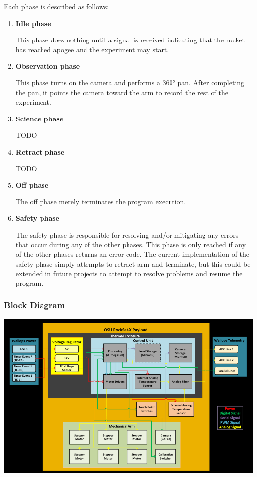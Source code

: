 Each phase is described as follows:
\begin{enumerate}
	\item{\textbf{Idle phase}}

	This phase does nothing until a signal is received indicating that the
	rocket has reached apogee and the experiment may start.

	\item{\textbf{Observation phase}}

	This phase turns on the camera and performs a 360° pan.
	After completing the pan, it points the camera toward the arm to record the
	rest of the experiment.

	\item{\textbf{Science phase}}

	TODO

	\item{\textbf{Retract phase}}

	TODO

	\item{\textbf{Off phase}}

	The off phase merely terminates the program execution.

	\item{\textbf{Safety phase}}

	The safety phase is responsible for resolving and/or mitigating any errors
	that occur during any of the other phases.
	This phase is only reached if any of the other phases returns an error
	code.
	The current implementation of the safety phase simply attempts to retract
	arm and terminate, but this could be extended in future projects to attempt to resolve
	problems and resume the program.
\end{enumerate}

\subsubsection{Block Diagram}
\includegraphics[width=\textwidth]{./images/ProjectDocs/functionalBlockDiagram}

